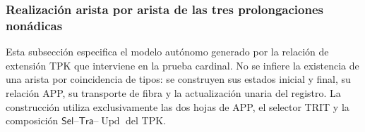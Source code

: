 \subsubsection{Realización arista por arista de las tres prolongaciones nonádicas}
\label{hmtfg:subsubsec:tres-vueltas-ext-ch}

Esta subsección especifica el modelo autónomo generado por la relación de
extensión TPK que interviene en la prueba cardinal. No se infiere la existencia de
una arista por coincidencia de tipos: se construyen sus estados inicial y final,
su relación APP, su transporte de fibra y la actualización unaria del registro.
La construcción utiliza exclusivamente las dos hojas de APP, el selector TRIT
y la composición \(\mathsf{Sel}\)--\(\mathsf{Tra}\)--\(\operatorname{Upd}\) del TPK.

